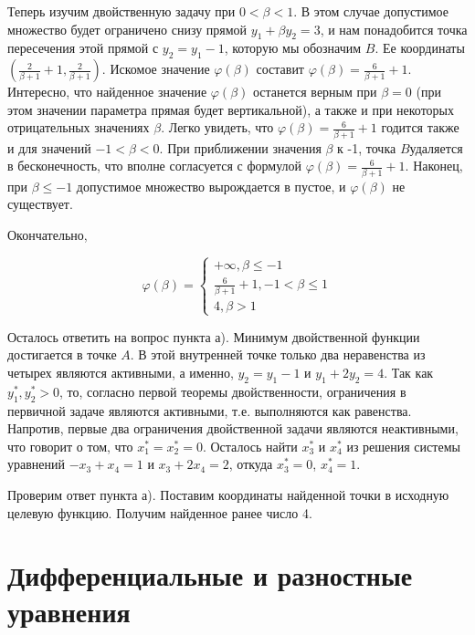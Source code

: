\begin{solution}
Теперь изучим двойственную задачу при $0<\beta <1$. В этом случае допустимое множество будет ограничено снизу прямой $y_{1} +\beta y_{2} =3$, и нам понадобится точка пересечения этой прямой с $y_{2} =y_{1} -1$, которую мы обозначим $B$. Ее координаты $\left(\frac{2}{\beta +1} +1,\frac{2}{\beta +1} \right)$. Искомое значение $\varphi (\beta )$ составит $\varphi (\beta )=\frac{6}{\beta +1} +1$. Интересно, что найденное значение $\varphi (\beta )$ останется верным при $\beta =0$ (при этом значении параметра прямая будет вертикальной), а также и при некоторых отрицательных значениях $\beta $. Легко увидеть, что $\varphi (\beta )=\frac{6}{\beta +1} +1$ годится также и для значений $-1<\beta <0$. При приближении значения $\beta $ к -1, точка $B$удаляется в бесконечность, что вполне согласуется с формулой $\varphi (\beta )=\frac{6}{\beta +1} +1$. Наконец, при $\beta \le -1$ допустимое множество вырождается в пустое, и $\varphi (\beta )$ не существует.

Окончательно,  

\[\varphi (\beta )=\left\{\begin{array}{l} {+\infty , \beta \le -1} \\ {\frac{6}{\beta +1} +1, -1<\beta \le 1} \\ {4, \beta >1} \end{array}\right. \] 

Осталось ответить на вопрос пункта а). Минимум двойственной функции достигается в точке $A$. В этой внутренней точке только два неравенства из четырех являются активными, а именно, $y_{2} =y_{1} -1$ и $y_{1} +2y_{2} =4$. Так как $y_{1}^{*} , y_{2}^{*} >0$, то, согласно первой теоремы двойственности, ограничения в первичной задаче являются активными, т.е. выполняются как равенства. Напротив, первые два ограничения двойственной задачи являются неактивными, что говорит о том, что $x_{1}^{*} =x_{2}^{*} =0$. Осталось найти $x_{3}^{*} $ и $x_{4}^{*} $ из решения системы уравнений $-x_{3} +x_{4} =1$ и $x_{3} +2x_{4} =2$, откуда $x_{3}^{*} =0$, $x_{4}^{*} =1$.

Проверим ответ пункта а). Поставим координаты найденной точки в исходную целевую функцию. Получим найденное ранее число 4.
\end{solution}




\section{Дифференциальные и разностные уравнения}



